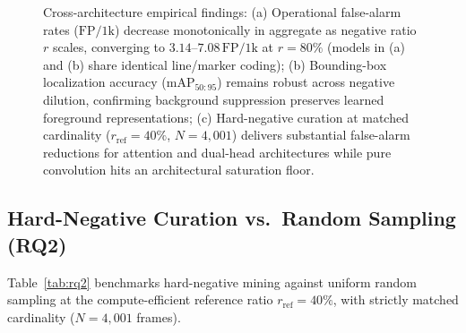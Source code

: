 \documentclass[conference]{IEEEtran}
\begin{document}
\begin{figure}[t]
\caption{Cross-architecture empirical findings: (a) Operational false-alarm rates ($\mathrm{FP/1k}$) decrease monotonically in aggregate as negative ratio $r$ scales, converging to $3.14$--$7.08\,\mathrm{FP/1k}$ at $r{=}80\%$ (models in (a) and (b) share identical line/marker coding); (b) Bounding-box localization accuracy ($\mathrm{mAP}_{50:95}$) remains robust across negative dilution, confirming background suppression preserves learned foreground representations; (c) Hard-negative curation at matched cardinality ($r_{\mathrm{ref}}{=}40\%$, $N{=}4{,}001$) delivers substantial false-alarm reductions for attention and dual-head architectures while pure convolution hits an architectural saturation floor.}
\label{fig:empirical_summary}
\end{figure}

\subsection{Hard-Negative Curation vs.\ Random Sampling (RQ2)}
\label{subsec:rq2_results}
Table~\ref{tab:rq2} benchmarks hard-negative mining against uniform random sampling
at the compute-efficient reference ratio $r_{\mathrm{ref}} = 40\%$, with strictly
matched cardinality ($N{=}4{,}001$ frames).
\end{document}
